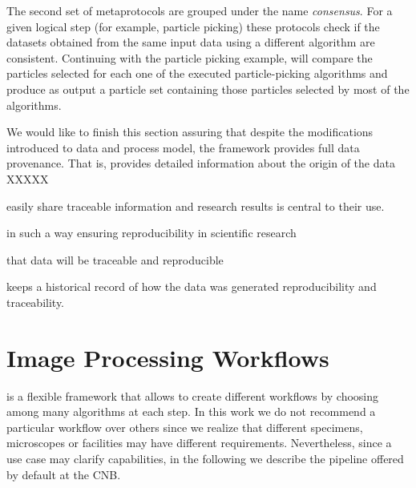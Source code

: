 The second set of metaprotocols are grouped under the name \emph{consensus}. For a given logical step (for example, particle picking) these protocols check if the datasets obtained from the same input data using a different algorithm are consistent. Continuing with the particle picking example,  will compare the particles selected for each one of the executed particle-picking algorithms and produce as output a particle set containing those particles selected by most of the algorithms.

We would like to finish this section assuring that despite the modifications introduced to \scipion data and process model, the framework provides full data provenance. That is, \scipion provides detailed information about the origin of the data XXXXX

 easily share traceable information and research results is central to their use.

in such a way  ensuring reproducibility in scientific research

that data will be traceable and reproducible



keeps a historical record of how the data was generated reproducibility and traceability.








\section{Image Processing Workflows}

\scipion is a flexible framework that allows to create different workflows by choosing among many algorithms at each step. In this work we do not recommend a particular workflow  over others since we realize that different specimens, microscopes or facilities may have different requirements. Nevertheless, since a use case may clarify \scipion capabilities, in the following we describe the pipeline offered by default at the CNB.

